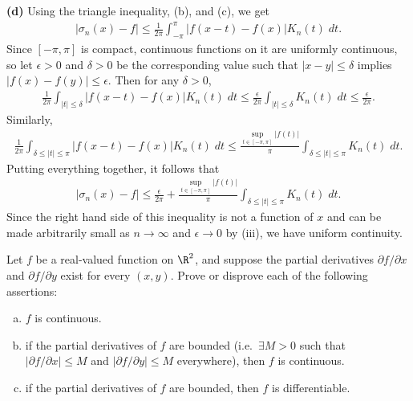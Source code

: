 \documentclass[11pt,letterpaper]{article}
\begin{document}
\begin{solution}
    \textbf{(d)} Using the triangle inequality, (b), and (c), we get
    \[
        \begin{aligned}
            |\sigma_n(x)-f|\leq \frac{1}{2\pi}\int^\pi_{-\pi}|f(x-t)-f(x)|K_n(t)\;dt.
        \end{aligned}
    \]
    Since $[-\pi,\pi]$ is compact, continuous functions on it are uniformly continuous, so let $\epsilon>0$ and $\delta>0$ be the corresponding value such that $|x-y|\leq \delta$ implies $|f(x)-f(y)|\leq \epsilon$. Then for any $\delta>0$,
    \[
        \begin{aligned}
            \frac{1}{2\pi}\int_{|t|\leq \delta} |f(x-t)-f(x)|K_n(t)\;dt \leq \frac{\epsilon}{2\pi}\int_{|t|\leq \delta}K_n(t)\;dt \leq \frac{\epsilon}{2\pi}.
        \end{aligned}
    \]  
    Similarly,
    \[
        \begin{aligned}
            \frac{1}{2\pi}\int_{\delta\leq |t|\leq \pi} |f(x-t)-f(x)|K_n(t)\;dt\leq \frac{\sup_{t\in [-\pi,\pi]}|f(t)|}{\pi}\int_{\delta\leq |t|\leq \pi}K_n(t)\;dt.
        \end{aligned}
    \] 
    Putting everything together, it follows that
    \[
        \begin{aligned}
            |\sigma_n(x)-f|\leq \frac{\epsilon}{2\pi}+\frac{\sup_{t\in [-\pi,\pi]}|f(t)|}{\pi}\int_{\delta\leq |t|\leq \pi}K_n(t)\;dt.
        \end{aligned}    
    \] 
    Since the right hand side of this inequality is not a function of $x$ and can be made arbitrarily small as $n\to \infty$ and $\epsilon\to 0$ by (iii), we have uniform continuity.
\end{solution}

\begin{problem}
    Let $f$ be a real-valued function on $\R^2$, and suppose the partial derivatives $\partial f/\partial x$ and $\partial f/\partial y$ exist for every $(x,y)$. Prove or disprove each of the following assertions:
    \begin{enumerate}[(a)]
        \item $f$ is continuous.
        \item if the partial derivatives of $f$ are bounded (i.e.\ $\exists M>0$ such that $|\partial
        f/\partial x|\leq M$ and $|\partial f/\partial y|\leq M$ everywhere), then $f$ is
        continuous.
        \item if the partial derivatives of $f$ are bounded, then $f$ is differentiable.
    \end{enumerate}
\end{problem}
\end{document}
